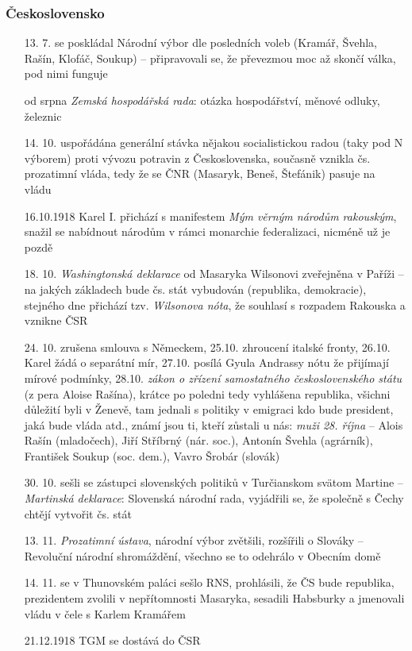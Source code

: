 \documentclass{article}
\begin{document}
\subsubsection*{Československo}
\begin{itemize}
  \item[13. 7.] se poskládal Národní výbor dle posledních voleb (Kramář, Švehla, Rašín, Klofáč, Soukup) -- připravovali se, že převezmou moc až skončí válka, pod nimi funguje
  \item[od srpna] \textit{Zemská hospodářská rada}: otázka hospodářství, měnové odluky, železnic
  \item[14. 10.] uspořádána generální stávka nějakou socialistickou radou (taky pod N výborem) proti vývozu potravin z Československa, současně vznikla čs. prozatimní vláda, tedy že se ČNR (Masaryk, Beneš, Štefánik) pasuje na vládu
  \item[16.10.1918] Karel I. přichází s manifestem \textit{Mým věrným národům rakouským}, snažil se nabídnout národům v rámci monarchie federalizaci, nicméně už je pozdě
  \item[18. 10.] \textit{Washingtonská deklarace} od Masaryka Wilsonovi zveřejněna v Paříži -- na jakých základech bude čs. stát vybudován (republika, demokracie), stejného dne přichází tzv. \textit{Wilsonova nóta}, že souhlasí s rozpadem Rakouska a vznikne ČSR
  \item[24. 10.] zrušena smlouva s Německem, 25.10. zhroucení italské fronty, 26.10. Karel žádá o separátní mír, 27.10. posílá Gyula Andrassy nótu že přijímají mírové podmínky, 28.10. \textit{zákon o zřízení samostatného čes\-ko\-slo\-ven\-ské\-ho státu} (z pera Aloise Rašína), krátce po poledni tedy vyhlášena republika, všichni důležití byli v Ženevě, tam jednali s politiky v emigraci kdo bude president, jaká bude vláda atd., známí jsou ti, kteří zůstali u nás: \textit{muži 28. října} -- Alois Rašín (mladočech), Jiří Stříbrný (nár. soc.), Antonín Švehla (agrárník), František Soukup (soc. dem.), Vavro Šrobár (slovák)
  \item[30. 10.] sešli se zástupci slovenských politiků v Turčianskom svätom Martine -- \textit{Martinská deklarace}: Slovenská národní rada, vyjádřili se, že společně s Čechy chtějí vytvořit čs. stát
  \item[13. 11.] \textit{Prozatimní ústava}, národní výbor zvětšili, rozšířili o Slováky -- Revoluční národní shromáždění, všechno se to odehrálo v Obecním domě
  \item[14. 11.] se v Thunovském paláci sešlo RNS, prohlásili, že ČS bude republika, prezidentem zvolili v nepřítomnosti Masaryka, sesadili Habsburky a jmenovali vládu v čele s Karlem Kramářem
  \item[21.12.1918] TGM se dostává do ČSR
\end{itemize}
\end{document}
